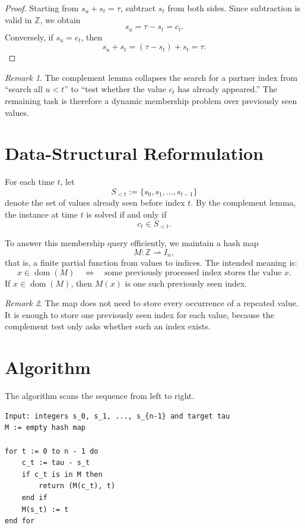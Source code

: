 \documentclass[11pt]{article}
\theoremstyle{remark}
\newtheorem{remark}{Remark}
\begin{document}
\begin{proof}
Starting from \(s_u + s_t = \tau\), subtract \(s_t\) from both sides. Since subtraction is valid in \(\mathbb{Z}\), we obtain
\[
s_u = \tau - s_t = c_t.
\]
Conversely, if \(s_u = c_t\), then
\[
s_u + s_t = (\tau - s_t) + s_t = \tau.
\]
\end{proof}

\begin{remark}
The complement lemma collapses the search for a partner index from ``search all \(u < t\)'' to ``test whether the value \(c_t\) has already appeared.'' The remaining task is therefore a dynamic membership problem over previously seen values.
\end{remark}

\section{Data-Structural Reformulation}

For each time \(t\), let
\[
S_{<t} := \{s_0, s_1, \dots, s_{t-1}\}
\]
denote the set of values already seen before index \(t\). By the complement lemma, the instance at time \(t\) is solved if and only if
\[
c_t \in S_{<t}.
\]

To answer this membership query efficiently, we maintain a hash map
\[
M : \mathbb{Z} \rightharpoonup I_n,
\]
that is, a finite partial function from values to indices. The intended meaning is:
\[
x \in \operatorname{dom}(M)
\quad \Longleftrightarrow \quad
\text{some previously processed index stores the value } x.
\]
If \(x \in \operatorname{dom}(M)\), then \(M(x)\) is one such previously seen index.

\begin{remark}
The map does not need to store every occurrence of a repeated value. It is enough to store one previously seen index for each value, because the complement test only asks whether such an index exists.
\end{remark}

\section{Algorithm}

The algorithm scans the sequence from left to right.

\begin{verbatim}
Input: integers s_0, s_1, ..., s_{n-1} and target tau
M := empty hash map

for t := 0 to n - 1 do
    c_t := tau - s_t
    if c_t is in M then
        return (M(c_t), t)
    end if
    M(s_t) := t
end for
\end{verbatim}
\end{document}
